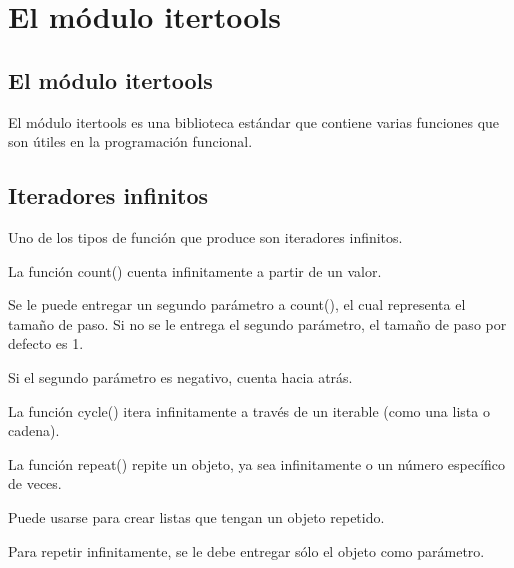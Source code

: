 \documentclass{report}
\begin{document}
\clearpage\chapter{El módulo itertools}

\section{El módulo itertools}

El módulo itertools es una biblioteca estándar que contiene varias funciones que son útiles en la programación funcional.


\section{Iteradores infinitos}

Uno de los tipos de función que produce son iteradores infinitos.

La función count() cuenta infinitamente a partir de un valor.


Se le puede entregar un segundo parámetro a count(), el cual representa el tamaño de paso. Si no se le entrega el segundo parámetro, el tamaño de paso por defecto es 1.


Si el segundo parámetro es negativo, cuenta hacia atrás.


La función cycle() itera infinitamente a través de un iterable (como una lista o cadena).



La función repeat() repite un objeto, ya sea infinitamente o un número específico de veces.


Puede usarse para crear listas que tengan un objeto repetido.


Para repetir infinitamente, se le debe entregar sólo el objeto como parámetro.

\end{document}
